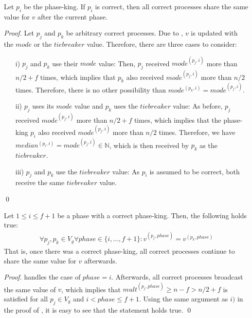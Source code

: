 \documentclass[runningheads]{llncs}
\begin{document}
\begin{lemma}\label{lemma:maxpk2}
    Let $p_i$ be the phase-king. If $p_i$ is correct, then all correct processes share the same value for $v$ after the current phase. 
\end{lemma}
\begin{proof}
    Let $p_j$ and $p_k$ be arbitrary correct processes. Due to , $v$ is updated with the $mode$ or the $tiebreaker$ value. Therefore, there are three cases to consider:
    \begin{enumerate}
        \item[i)] $p_j$ and $p_k$ use their $mode$ value: Then, $p_j$ received $mode^{(p_j,i)}$ more than $n/2+f$ times, which implies that $p_k$ also received $mode^{(p_j,i)}$ more than $n/2$ times. Therefore, there is no other possibility than $mode^{(p_k,i)} = mode^{(p_j,i)}$.
        \item[ii)] $p_j$ uses its $mode$ value and $p_k$ uses the $tiebreaker$ value: As before, $p_j$ received $mode^{(p_j,i)}$ more than $n/2+f$ times, which implies that the phase-king $p_i$ also received $mode^{(p_j,i)}$ more than $n/2$ times. Therefore, we have $median^{(p_i,i)} = mode^{(p_j,i)} \in \mathbb{N}$, which is then received by $p_k$ as the $tiebreaker$.
        \item[iii)] $p_j$ and $p_k$ use the $tiebreaker$ value: As $p_i$ is assumed to be correct, both receive the same $tiebreaker$ value. 
    \end{enumerate} \qed
\end{proof}

\begin{lemma}\label{lemma:maxpk3}
    Let $1 \leq i \leq f+1$ be a phase with a correct phase-king. Then, the following holds true:
    \begin{align*}
        \forall p_j, p_k \in V_g \forall phase \in \{i, \ldots, f+1\}: v^{(p_j, phase)} = v^{(p_k, phase)}
    \end{align*}
    That is, once there was a correct phase-king, all correct processes continue to share the same value for $v$ afterwards. 
\end{lemma}
\begin{proof}
     handles the case of $phase = i$. Afterwards, all correct processes broadcast the same value of $v$, which implies that $mult^{(p_j, phase)} \geq n-f > n/2+f$ is satisfied for all $p_j \in V_g$ and $i < phase \leq f+1$. Using the same argument as $i)$ in the proof of , it is easy to see that the statement holds true. \qed
\end{proof}
\end{document}
